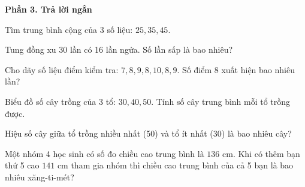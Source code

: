 \textbf{Phần 3. Trả lời ngắn}

\begin{ex} %
Tìm trung bình cộng của 3 số liệu: $25, 35, 45$.
\end{ex}

\begin{ex} %
Tung đồng xu 30 lần có 16 lần ngửa. Số lần sấp là bao nhiêu?
\end{ex}

\begin{ex} %
Cho dãy số liệu điểm kiểm tra: $7, 8, 9, 8, 10, 8, 9$. Số điểm 8 xuất hiện bao nhiêu lần?
\end{ex}

\begin{ex} %
Biểu đồ số cây trồng của 3 tổ: $30, 40, 50$. Tính số cây trung bình mỗi tổ trồng được.
\end{ex}

\begin{ex} %
Hiệu số cây giữa tổ trồng nhiều nhất (50) và tổ ít nhất (30) là bao nhiêu cây?
\end{ex}

\begin{ex} %
Một nhóm 4 học sinh có số đo chiều cao trung bình là $136\text{ cm}$. Khi có thêm bạn thứ 5 cao $141\text{ cm}$ tham gia nhóm thì chiều cao trung bình của cả 5 bạn là bao nhiêu xăng-ti-mét?
\end{ex}
